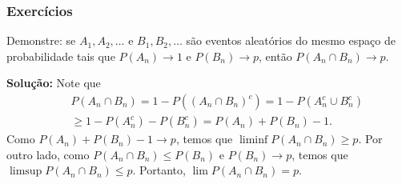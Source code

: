\begin{frame}
\frametitle{\textbf{Exercícios}}
\baselineskip=13pt

\begin{example}
Demonstre: se $A_1,A_2,\ldots$ e $B_1,B_2,\ldots$ são eventos aleatórios do mesmo espaço de probabilidade tais que
$P(A_n)\rightarrow 1$ e $P(B_n)\rightarrow p$, então $P(A_n\cap B_n)\rightarrow p$.

{\bf Solução: } Note que
\begin{eqnarray}
& & P(A_n\cap B_n)=1-P((A_n\cap B_n)^c)=1-P(A_n^c\cup B_n^c) \nonumber \\
& & \geq 1-P(A_n^c)-P(B_n^c)=P(A_n)+P(B_n)-1.
\end{eqnarray}
Como $P(A_n)+P(B_n)-1\rightarrow p$, temos que $\liminf P(A_n\cap B_n)\geq p$. Por outro lado, como $P(A_n\cap B_n)\leq P(B_n)$ e $P(B_n)\rightarrow p$, temos que $\limsup P(A_n\cap B_n)\leq p$. Portanto, $\lim P(A_n\cap B_n)=p$.
\end{example}

\end{frame}


